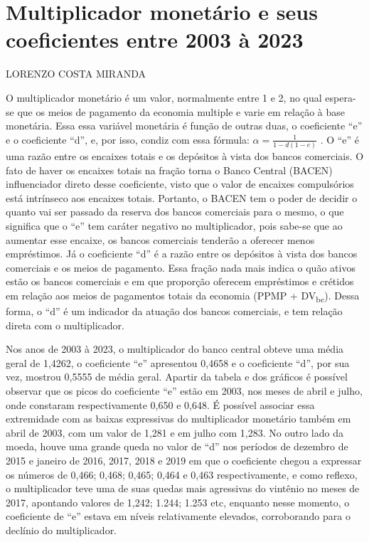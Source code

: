 \documentclass[12pt]{article}
\author{Lorenzo Costa Miranda}
\date{} %
\begin{document}
\section*{Multiplicador monetário e seus coeficientes entre 2003 à 2023}
\hspace{4.5cm} LORENZO COSTA MIRANDA
\vspace*{5pt}



O multiplicador monetário é um valor, normalmente entre 1 e 2, no qual
espera-se que os meios de pagamento da economia multiple e varie em
relação à base monetária. Essa essa variável monetária é função de
outras duas, o coeficiente ``e'' e o coeficiente ``d'', e, por isso,
condiz com essa fórmula: \(\alpha = \frac{1}{1-d(1-e)}\) . O ``e'' é uma
razão entre os encaixes totais e os depósitos à vista dos bancos
comerciais. O fato de haver os encaixes totais na fração torna o Banco
Central (BACEN) influenciador direto desse coeficiente, visto que o
valor de encaixes compulsórios está intrínseco aos encaixes totais.
Portanto, o BACEN tem o poder de decidir o quanto vai ser passado da
reserva dos bancos comerciais para o mesmo, o que significa que o ``e''
tem caráter negativo no multiplicador, pois sabe-se que ao aumentar esse
encaixe, os bancos comerciais tenderão a oferecer menos empréstimos. Já
o coeficiente ``d'' é a razão entre os depósitos à vista dos bancos
comerciais e os meios de pagamento. Essa fração nada mais indica o quão
ativos estão os bancos comerciais e em que proporção oferecem
empréstimos e crétidos em relação aos meios de pagamentos totais da
economia (PPMP + DV\textsubscript{bc}). Dessa forma, o ``d'' é um
indicador da atuação dos bancos comerciais, e tem relação direta com o
multiplicador.

Nos anos de 2003 à 2023, o multiplicador do banco central obteve uma
média geral de 1,4262, o coeficiente ``e'' apresentou 0,4658 e o
coeficiente ``d'', por sua vez, mostrou 0,5555 de média geral. Apartir
da tabela e dos gráficos é possível observar que os picos do coeficiente
``e'' estão em 2003, nos meses de abril e julho, onde constaram
respectivamente 0,650 e 0,648. É possível associar essa extremidade com
as baixas expressivas do multiplicador monetário também em abril de
2003, com um valor de 1,281 e em julho com 1,283. No outro lado da
moeda, houve uma grande queda no valor de ``d'' nos períodos de dezembro
de 2015 e janeiro de 2016, 2017, 2018 e 2019 em que o coeficiente chegou
a expressar os números de 0,466; 0,468; 0,465; 0,464 e 0,463
respectivamente, e como reflexo, o multiplicador teve uma de suas quedas
mais agressivas do vintênio no meses de 2017, apontando valores de
1,242; 1.244; 1.253 etc, enquanto nesse momento, o coeficiente de ``e''
estava em níveis relativamente elevados, corroborando para o declínio do
multiplicador.
\end{document}
